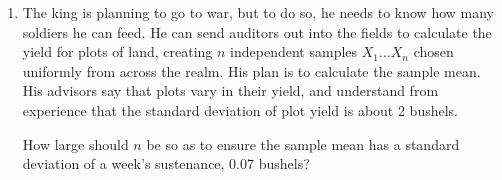 \documentclass[12pt]{article}
\begin{document}
\begin{enumerate}
\item The king is planning to go to war, but to do so, he needs to know how many soldiers he can feed.   He can send auditors out into the fields to calculate the yield for plots of land, creating $n$ independent samples $X_1... X_n$ chosen uniformly from across the realm.  His plan is to calculate the sample mean.  His advisors say that plots vary in their yield, and understand from experience that the standard deviation of plot yield is about 2 bushels.  

How large should $n$ be so as to ensure the sample mean has a standard deviation of a week's sustenance, 0.07 bushels?  


\end{enumerate}
\end{document}
